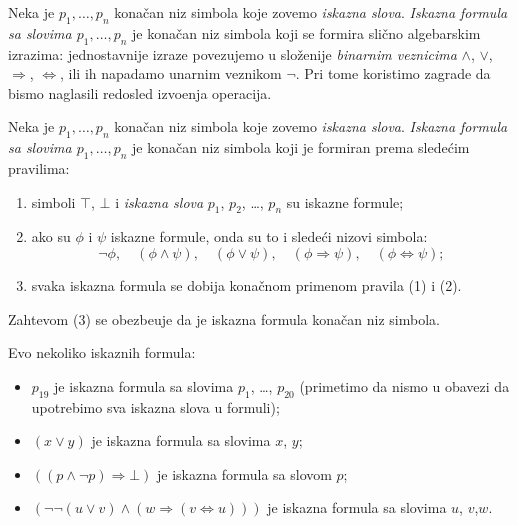 \ifBIOINF
      Neka je $p_1, \ldots, p_n$ kona\v can niz simbola koje zovemo \emph{iskazna slova}.
      \emph{Iskazna formula sa slovima $p_1, \ldots, p_n$}
      je kona\v can niz simbola koji se formira sli\v cno algebarskim izrazima:
	  jednostavnije izraze povezujemo u slo\v zenije \emph{binarnim veznicima}
	  $\land$, $\lor$, $\Rightarrow$, $\Leftrightarrow$, ili ih napadamo unarnim veznikom $\lnot$.
	  Pri tome koristimo zagrade da bismo naglasili redosled izvo\dj enja operacija.
\else
    \begin{DEF}
      Neka je $p_1, \ldots, p_n$ kona\v can niz simbola koje zovemo \emph{iskazna slova}.
      \emph{Iskazna formula sa slovima $p_1, \ldots, p_n$}
      je kona\v can niz simbola koji je formiran prema slede\'cim pravilima:
      \begin{enumerate}\itemsep -1mm
      \item
        simboli $\top$, $\bot$ i
        \emph{iskazna slova} $p_1$, $p_2$, \ldots, $p_n$ su iskazne formule;
      \item
        ako su $\phi$ i $\psi$ iskazne formule, onda su to i slede\'ci nizovi simbola:
        $$
          \lnot \phi, \quad (\phi \land \psi), \quad (\phi \lor \psi), \quad (\phi \Rightarrow \psi), \quad (\phi \Leftrightarrow \psi);
        $$
      \item
        svaka iskazna formula se dobija kona\v cnom primenom pravila (1) i (2).
      \end{enumerate}
      Zahtevom (3) se obezbe\dj uje da je iskazna formula kona\v can niz simbola.
    \end{DEF}
\fi

\begin{EX}
  Evo nekoliko iskaznih formula:
  \begin{itemize}
    \item $p_{19}$ je iskazna formula sa slovima $p_1$, \ldots, $p_{20}$ (primetimo da nismo u obavezi da upotrebimo sva iskazna slova u formuli);
    \item $(x \lor y)$ je iskazna formula sa slovima $x$, $y$;
    \item $((p \land \lnot p) \Rightarrow \bot)$ je iskazna formula sa slovom $p$;
    \item $(\lnot \lnot(u \lor v) \land (w \Rightarrow (v \Leftrightarrow u)))$ je iskazna formula sa slovima $u$, $v$,$w$.
  \end{itemize}
\end{EX}

